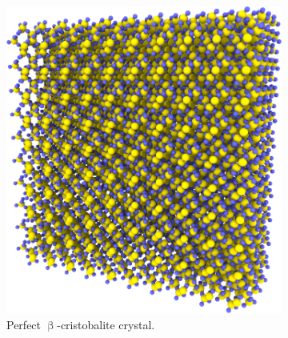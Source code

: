 \begin{figure}[htpb]%
    \setlength{\myfigwidth}{0.35\textwidth}%
    \setlength{\myhfillwidth}{1.5cm}%
    \centering%
    \begin{subfigure}[t]{\myfigwidth}
        \captionsetup{width=1.1\textwidth}%
        \includegraphics[width=\textwidth]{images/experimental_procedure/00_10}%
        \caption{%
            Perfect $\upbeta$-cristobalite crystal.%
            \label{fig:initialization_step00}%
            \label{fig:cristobalite_crystal}%
        }%
        \hspace{8pt}
    \end{subfigure}%
    \hspace{\myhfillwidth}%
    \begin{subfigure}[t]{\myfigwidth}%

\end{subfigure}
\end{figure}
